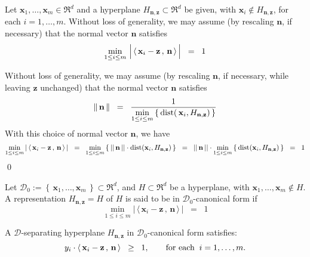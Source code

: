 \vskip 0.5cm
\begin{lemma}
\mbox{}
\vskip 0.1cm
\noindent
Let $\mathbf{x}_{1},\ldots,\mathbf{x}_{m}\in\Re^{d}$ and a hyperplane $H_{\mathbf{n},\mathbf{z}} \subset \Re^{d}$ be given, with $\mathbf{x}_{i} \notin H_{\mathbf{n},\mathbf{z}}$, for each $i = 1,\ldots,m$.  Without loss of generality, we may assume (by rescaling $\mathbf{n}$, if necessary) that the normal vector $\mathbf{n}$ satisfies
\begin{equation*}
\underset{1\leq i \leq m}{\min}\,
\left\vert\,\langle\,\mathbf{x}_{i} \overset{{\color{white}.}}{-} \mathbf{z} \,,\, \mathbf{n}\,\rangle\,\right\vert
\;\; = \;\; 1
\end{equation*}
\end{lemma}
\proof
Without loss of generality, we may assume (by rescaling $\mathbf{n}$, if necessary, while leaving $\mathbf{z}$ unchanged) that the normal vector $\mathbf{n}$ satisfies
\begin{equation*}
\Vert\,\mathbf{n}\,\Vert \;\; = \;\; \dfrac{1}{\underset{1\leq i \leq m}{\min}\left\{\,\textnormal{dist}\!\left(\,\mathbf{x}_{i},H_{\mathbf{n},\mathbf{z}}\right)\,\right\}}
\end{equation*}
With this choice of normal vector $\mathbf{n}$, we have
\begin{equation*}
\underset{1\leq i \leq m}{\min}\left\vert\,\langle\,\mathbf{x}_{i} - \mathbf{z} \,,\, \mathbf{n}\,\rangle\,\right\vert
\;\; = \;\;
\underset{1\leq i \leq m}{\min}\left\{\,||\,\mathbf{n}\,||\cdot\textnormal{dist}\!\left(\mathbf{x}_{i},H_{\mathbf{n},\mathbf{z}}\right)\,\right\}
\;\; = \;\;
||\,\mathbf{n}\,||\cdot\underset{1\leq i \leq m}{\min}\left\{\,\textnormal{dist}\!\left(\mathbf{x}_{i},H_{\mathbf{n},\mathbf{z}}\right)\,\right\}
\;\; = \;\; 1
\end{equation*}
\qed

\begin{definition}
\mbox{}
\vskip 0.1cm
\noindent
Let $\mathcal{D}_{0} := \left\{\,\mathbf{x}_{1},\ldots,\mathbf{x}_{m}\,\right\} \subset \Re^{d}$, and $H \subset \Re^{d}$ be a hyperplane, with $\mathbf{x}_{1}, \ldots, \mathbf{x}_{m} \notin H$.  A representation $H_{\mathbf{n},\mathbf{z}} = H$ of $H$ is said to be in $\mathcal{D}_{0}$-canonical form if
\begin{equation*}
\underset{1\leq i \leq m}{\min}\left\vert\,\langle\,\mathbf{x}_{i} - \mathbf{z} \,,\, \mathbf{n}\,\rangle\,\right\vert \;\; = \;\; 1
\end{equation*}
\end{definition}

\vskip 0.5cm
\begin{corollary}
\mbox{}
\vskip 0.1cm
\noindent
A $\mathcal{D}$-separating hyperplane $H_{\mathbf{n},\mathbf{z}}$ in $\mathcal{D}_{0}$-canonical form satisfies:
\begin{equation*}
y_{i}\cdot\langle\,\mathbf{x}_{i}-\mathbf{z}\,,\,\mathbf{n}\,\rangle \;\; \geq \;\; 1,
\quad\quad
\textnormal{for each} \;\; i = 1, \ldots, m.
\end{equation*}
\end{corollary}

